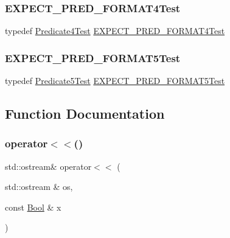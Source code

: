 \subsubsection{\texorpdfstring{EXPECT\_PRED\_FORMAT4Test}{EXPECT\_PRED\_FORMAT4Test}}
{\footnotesize\ttfamily typedef \mbox{\hyperlink{class_predicate4_test}{Predicate4\+Test}} \mbox{\hyperlink{googletest-master_2googletest_2test_2gtest__pred__impl__unittest_8cc_a259c13bd25f54a4f79b72de17fd86caa}{E\+X\+P\+E\+C\+T\+\_\+\+P\+R\+E\+D\+\_\+\+F\+O\+R\+M\+A\+T4\+Test}}}

\mbox{\label{_obj__test_2lib_2googletest-release-1_88_81_2googletest_2test_2gtest__pred__impl__unittest_8cc_aedface39db3a4a232e856e9e5b0d93b4}} 
\subsubsection{\texorpdfstring{EXPECT\_PRED\_FORMAT5Test}{EXPECT\_PRED\_FORMAT5Test}}
{\footnotesize\ttfamily typedef \mbox{\hyperlink{class_predicate5_test}{Predicate5\+Test}} \mbox{\hyperlink{googletest-master_2googletest_2test_2gtest__pred__impl__unittest_8cc_aedface39db3a4a232e856e9e5b0d93b4}{E\+X\+P\+E\+C\+T\+\_\+\+P\+R\+E\+D\+\_\+\+F\+O\+R\+M\+A\+T5\+Test}}}



\subsection{Function Documentation}
\mbox{\label{_obj__test_2lib_2googletest-release-1_88_81_2googletest_2test_2gtest__pred__impl__unittest_8cc_a0bf98bd8ef2c5ea5ea36ff15c1248b8a}} 
\subsubsection{\texorpdfstring{operator$<$$<$()}{operator<<()}}
{\footnotesize\ttfamily std\+::ostream\& operator$<$$<$ (\begin{DoxyParamCaption}\item[{std\+::ostream \&}]{os,  }\item[{const \mbox{\hyperlink{struct_bool}{Bool}} \&}]{x }\end{DoxyParamCaption})}

